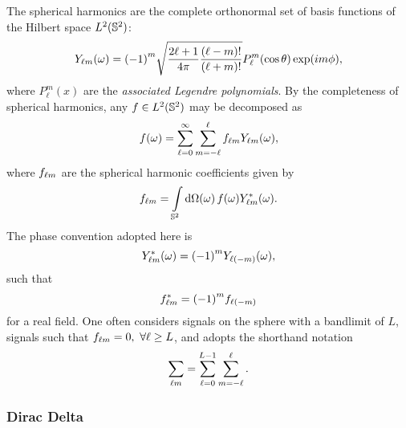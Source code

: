 The spherical harmonics are the complete orthonormal set of basis functions of the Hilbert space \(L^{2}(\mathbb{S}^{2})\):
%
\begin{equation}\label{eq:chapter3_spherical_harmonic}
	{Y}_{\ell m}(\omega)
	= {(-1)}^{m} \sqrt{\frac{2\ell+1}{4\pi} \frac{(\ell-m)!}{(\ell+m)!}} P^{m}_{\ell}(\cos{\theta}) \exp(i m\phi),
\end{equation}
%
where \(P^{m}_{\ell}(x)\) are the \emph{associated Legendre polynomials}.
By the completeness of spherical harmonics, any \(f \in L^{2}(\mathbb{S}^{2})\) may be decomposed as
%
\begin{equation}
	f(\omega)
	= \sum\limits_{\ell=0}^{\infty} \sum\limits_{m=-\ell}^{\ell} {f}_{\ell m} {Y}_{\ell m}(\omega),
\end{equation}
%
where \({f}_{\ell m}\) are the spherical harmonic coefficients given by
%
\begin{equation}
	{f}_{\ell m}
	= \displaystyle\int\limits_{\mathbb{S}^{2}} \dd{\Omega(\omega)} f(\omega) {Y}_{\ell m}^{\ast}(\omega).
\end{equation}
%
The phase convention adopted here is
%
\begin{equation}\label{eq:chapter3_spherical_harmonic_phase}
	{Y}_{\ell m}^{\ast}(\omega)
	= {(-1)}^{m} Y_{\ell(-m)}(\omega),
\end{equation}
%
such that
%
\begin{equation}
	{f}_{\ell m}^{\ast}
	= {(-1)}^{m} f_{\ell(-m)}
\end{equation}
%
for a real field.
One often considers signals on the sphere with a bandlimit of \(L\), \ie{} signals such that \({f}_{\ell m} = 0,\ \forall \ell \geq L\), and adopts the shorthand notation
%
\begin{equation}
	\displaystyle\sum\limits_{\ell m}
	= \sum\limits_{\ell=0}^{L-1} \sum\limits_{m=-\ell}^{\ell}.
\end{equation}

\subsubsection{Dirac Delta}

